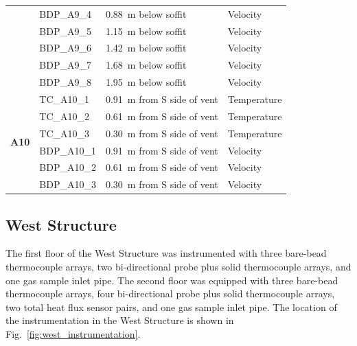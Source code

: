 \documentclass[12pt,oneside]{book}
\begin{document}
\begin{longtable}[c]{c|lll}
 & BDP\_A9\_4 & 0.88~m below soffit  & Velocity \\
 & BDP\_A9\_5 & 1.15~m below soffit  & Velocity \\
 & BDP\_A9\_6 & 1.42~m below soffit  & Velocity \\
 & BDP\_A9\_7 & 1.68~m below soffit  & Velocity \\
 & BDP\_A9\_8 & 1.95~m below soffit  & Velocity \\
\midrule
\multirow{6}{*}{\large{\textbf{A10}}}
 & TC\_A10\_1 & 0.91~m from S side of vent & Temperature \\
 & TC\_A10\_2 & 0.61~m from S side of vent & Temperature \\
 & TC\_A10\_3 & 0.30~m from S side of vent & Temperature \\
\cline{2-4}
 & BDP\_A10\_1 & 0.91~m from S side of vent & Velocity \\
 & BDP\_A10\_2 & 0.61~m from S side of vent & Velocity \\
 & BDP\_A10\_3 & 0.30~m from S side of vent & Velocity \\
\bottomrule
\end{longtable}
\clearpage

\subsection{West Structure}
The first floor of the West Structure was instrumented with three bare-bead thermocouple arrays, two bi-directional probe plus solid thermocouple arrays, and one gas sample inlet pipe. The second floor was equipped with three bare-bead thermocouple arrays, four bi-directional probe plus solid thermocouple arrays, two total heat flux sensor pairs, and one gas sample inlet pipe. The location of the instrumentation in the West Structure is shown in Fig.~\ref{fig:west_instrumentation}.
\end{document}
